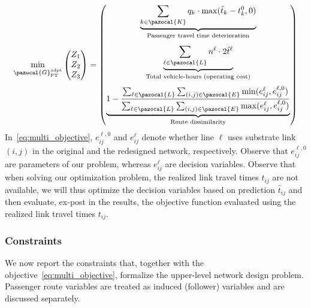 \documentclass[a4paper,fleqn]{cas-sc}
\begin{document}
\begin{equation}
\label{eq:multi_objective}
\min_{\pazocal{G}_{\text{PT}}^{\text{adpt}}} \begin{pmatrix} Z_1 \\ Z_2 \\ Z_3 \end{pmatrix} = \begin{pmatrix}
\underbrace{\sum_{k \in \pazocal{K}} q_k \cdot \max(\hat{t}_k - t_k^0, 0)}_{\text{Passenger travel time deterioration}} \\[8ex]
\underbrace{\sum_{\ell \in \pazocal{L}} n^\ell \cdot 2\hat{t}^\ell}_{\text{Total vehicle-hours (operating cost)}} \\[8ex]
\underbrace{1 - \frac{\sum_{\ell \in \pazocal{L}} \sum_{(i,j) \in \pazocal{E}} \min(e_{ij}^\ell, e_{ij}^{\ell, 0})}{\sum_{\ell \in \pazocal{L}} \sum_{(i,j) \in \pazocal{E}} \max(e_{ij}^\ell, e_{ij}^{\ell, 0})}}_{\text{Route dissimilarity}}
\end{pmatrix}
\end{equation}
In~\eqref{eq:multi_objective}, $e_{ij}^{\ell, 0}$ and $e_{ij}^\ell$ denote whether line $\ell$ uses substrate link $(i, j)$ in the original and the redesigned network, respectively. Observe that $e_{ij}^{\ell, 0}$ are parameters of our problem, whereas $e_{ij}^\ell$ are decision variables.
%
Observe that when solving our optimization problem, the realized link travel times $t_{ij}$ are not available, we will thus optimize the decision variables based on prediction $\hat{t}_{ij}$ and then evaluate, ex-post in the results, the objective function evaluated using the realized link travel times $t_{ij}$.



\subsubsection{Constraints}
We now report the constraints that, together with the objective~\eqref{eq:multi_objective},
formalize the upper-level network design problem. Passenger route variables are treated as induced (follower) variables and are discussed separately.
\end{document}
